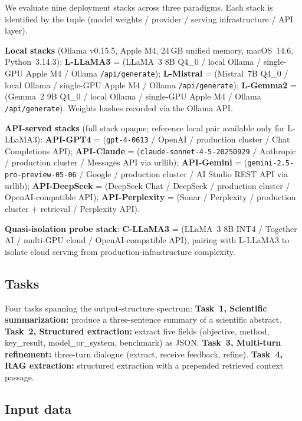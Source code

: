 \documentclass[sn-nature]{sn-jnl}
\begin{document}
We evaluate nine deployment stacks across three paradigms.
Each stack is identified by the tuple (model weights / provider / serving infrastructure / API layer).

\textbf{Local stacks} (Ollama v0.15.5, Apple M4, 24\,GB unified memory, macOS~14.6, Python~3.14.3):
\textbf{L-LLaMA3} = (LLaMA~3 8B Q4\_0\cite{grattafiori2024llama3} / local Ollama / single-GPU Apple M4 / Ollama \texttt{/api/generate});
\textbf{L-Mistral} = (Mistral~7B Q4\_0\cite{jiang2023mistral} / local Ollama / single-GPU Apple M4 / Ollama \texttt{/api/generate});
\textbf{L-Gemma2} = (Gemma~2 9B Q4\_0\cite{team2024gemma} / local Ollama / single-GPU Apple M4 / Ollama \texttt{/api/generate}).
Weights hashes recorded via the Ollama API.

\textbf{API-served stacks} (full stack opaque; reference local pair available only for L-LLaMA3):
\textbf{API-GPT4} = (\texttt{gpt-4-0613}\cite{achiam2023gpt4} / OpenAI / production cluster / Chat Completions API);
\textbf{API-Claude} = (\texttt{claude-sonnet-4-5-20250929}\cite{anthropic2024claude} / Anthropic / production cluster / Messages API via urllib);
\textbf{API-Gemini} = (\texttt{gemini-2.5-pro-preview-05-06}\cite{reid2024gemini15} / Google / production cluster / AI Studio REST API via urllib);
\textbf{API-DeepSeek} = (DeepSeek Chat / DeepSeek / production cluster / OpenAI-compatible API);
\textbf{API-Perplexity} = (Sonar / Perplexity / production cluster + retrieval / Perplexity API).

\textbf{Quasi-isolation probe stack}:
\textbf{C-LLaMA3} = (LLaMA~3 8B INT4\cite{grattafiori2024llama3} / Together AI / multi-GPU cloud / OpenAI-compatible API), pairing with L-LLaMA3 to isolate cloud serving from production-infrastructure complexity.


\subsection{Tasks}\label{subsec:tasks}

Four tasks spanning the output-structure spectrum:
\textbf{Task~1, Scientific summarization:} produce a three-sentence summary of a scientific abstract.
\textbf{Task~2, Structured extraction:} extract five fields (objective, method, key\_result, model\_or\_system, benchmark) as JSON.
\textbf{Task~3, Multi-turn refinement:} three-turn dialogue (extract, receive feedback, refine).
\textbf{Task~4, RAG extraction:} structured extraction with a prepended retrieved context passage.


\subsection{Input data}\label{subsec:input}
\end{document}
